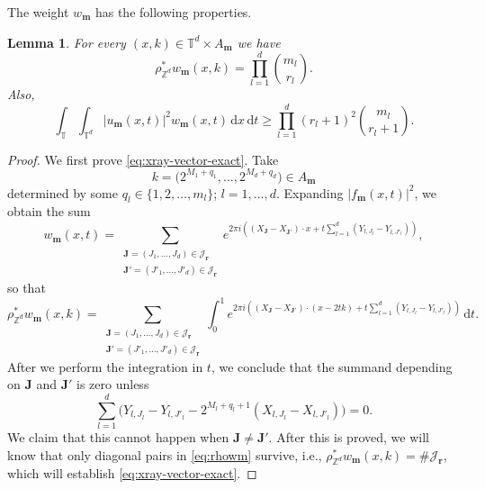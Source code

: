 \documentclass[10pt,a4paper]{amsart}
\newtheorem{lemma}[theorem]{Lemma}
\numberwithin{equation}{section}
\newcommand{\dd}{\,\mathrm{d}}
\renewcommand{\ge}{\geqslant}
\begin{document}
The weight $w_{\mathbf{m}}$ has the following properties.

\begin{lemma}\label{lm:dyadic-test-estimates}
For every $(x,k)\in\mathbb{T}^d\times A_{\mathbf{m}}$ we have
\begin{equation}\label{eq:xray-vector-exact}
\rho^{\ast}_{\mathbb{Z}^d}w_{\mathbf{m}}(x,k) = \prod_{l=1}^d\binom{m_l}{r_l}.
\end{equation}
Also,
\begin{equation}\label{eq:numerator-vector-lower}
\int_{\mathbb{T}} \int_{\mathbb{T}^d} |u_{\mathbf{m}}(x,t)|^2 w_{\mathbf{m}}(x,t)\dd x\dd t \ge \prod_{l=1}^d (r_l+1)^2\binom{m_l}{r_l+1}.
\end{equation}
\end{lemma}

\begin{proof}
We first prove \eqref{eq:xray-vector-exact}. Take 
\[ k = \bigl(2^{M_1+q_1},\ldots,2^{M_d+q_d}\bigr)\in A_{\mathbf{m}} \]
determined by some $q_l\in\{1,2,\ldots,m_l\}$; $l=1,\ldots,d$. Expanding $|f_{\mathbf{m}}(x,t)|^2$, we obtain the sum
\[ w_{\mathbf{m}}(x,t) = \sum_{\substack{\mathbf{J}=(J_1,\ldots,J_d)\in\mathcal{J}_{\mathbf{r}} \\ \mathbf{J}'=(J'_1,\ldots,J'_d)\in\mathcal{J}_{\mathbf{r}}}} e^{2\pi i\left((X_{\mathbf{J}}-X_{\mathbf{J}'})\cdot x+ t\sum_{l=1}^d(Y_{l,J_l}-Y_{l,J'_l})\right)}, \]
so that
\begin{equation}\label{eq:rhowm}
\rho^{\ast}_{\mathbb{Z}^d}w_{\mathbf{m}}(x,k) = \sum_{\substack{\mathbf{J}=(J_1,\ldots,J_d)\in\mathcal{J}_{\mathbf{r}} \\ \mathbf{J}'=(J'_1,\ldots,J'_d)\in\mathcal{J}_{\mathbf{r}}}} \int_0^1 e^{2\pi i\left((X_{\mathbf{J}}-X_{\mathbf{J}'})\cdot (x-2tk) + t\sum_{l=1}^d(Y_{l,J_l}-Y_{l,J'_l})\right)} \dd t.
\end{equation}
After we perform the integration in $t$, we conclude that the summand depending on $\mathbf{J}$ and $\mathbf{J}'$ is zero unless
\begin{equation}\label{eq:dyadic-relation0}
\sum_{l=1}^d \bigl(Y_{l,J_l}-Y_{l,J'_l} - 2^{M_l+q_l+1}(X_{l,J_l}-X_{l,J'_l})\bigr) = 0.
\end{equation}
We claim that this cannot happen when $\mathbf{J}\neq\mathbf{J}'$. After this is proved, we will know that only diagonal pairs in \eqref{eq:rhowm} survive, i.e.,
$\rho^{\ast}_{\mathbb{Z}^d}w_{\mathbf{m}}(x,k) = \#\mathcal{J}_{\mathbf{r}}$,
which will establish \eqref{eq:xray-vector-exact}.


\end{proof}
\end{document}
